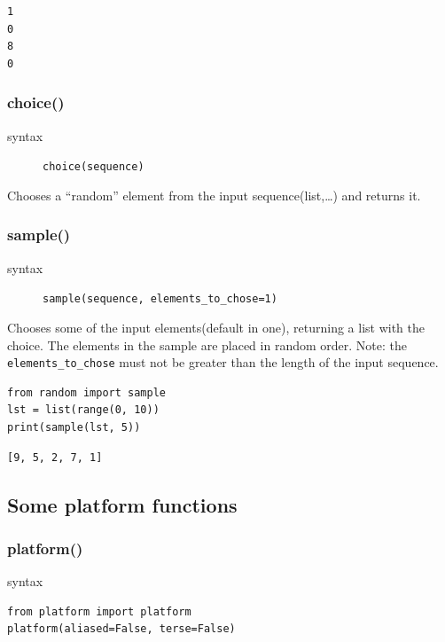 \documentclass[11pt]{article}
\begin{document}
\begin{verbatim}
1
0
8
0
\end{verbatim}

\subsubsection{choice()}
\label{sec:orgb30d0e7}
\begin{description}
\item[{syntax}] \texttt{choice(sequence)}
\end{description}
Chooses a “random” element from the input sequence(list,\ldots{}) and
returns it.
\subsubsection{sample()}
\label{sec:org17fdac0}
\begin{description}
\item[{syntax}] \texttt{sample(sequence, elements\_to\_chose=1)}
\end{description}
Chooses some of the input elements(default in one), returning a list with the
choice. The elements in the sample are placed in random order. Note:
the \texttt{elements\_to\_chose} must not be greater than the length of the input
sequence.


\begin{verbatim}
from random import sample
lst = list(range(0, 10))
print(sample(lst, 5))
\end{verbatim}

\begin{verbatim}
[9, 5, 2, 7, 1]
\end{verbatim}


\newpage

\subsection{Some platform functions}
\label{sec:org69fa4c9}
\subsubsection{platform()}
\label{sec:org01ce961}
\begin{description}
\item[{syntax}] 
\end{description}
\begin{verbatim}
from platform import platform
platform(aliased=False, terse=False)
\end{verbatim}
\end{document}
